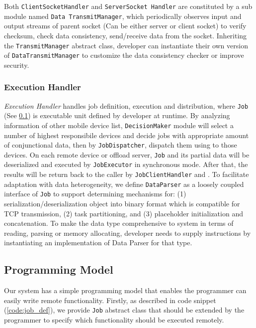 \documentclass[conference]{IEEEtran}
\begin{document}
Both \texttt{ClientSocketHandler} and \texttt{ServerSocket Handler} are constituted by a sub module named \texttt{Data TransmitManager}, which periodically observes input and output streams of parent socket (Can be either server or client socket) to verify checksum, check data consistency, send/receive data from the socket. Inheriting the \texttt{TransmitManager} abstract class, developer can instantiate their own version of \texttt{DataTransmitManager} to customize the data consistency checker or improve security. 

\subsubsection{Execution Handler}
\emph{Execution Handler} handles job definition, execution and distribution, where \texttt{Job} (See \ref{prog_model}) is executable unit defined by developer at runtime. By analyzing information of other mobile device list, \texttt{DecisionMaker} module will select a number of highest responsibile devices and decide jobs with appropriate amount of conjunctional data, then by \texttt{JobDispatcher}, dispatch them using to those devices. On each remote device or offload server, \texttt{Job} and its partial data will be deserialized and executed by \texttt{JobExecutor} in synchronous mode. After that, the results will be return back to the caller by \texttt{JobClientHandler} and . To facilitate adaptation with data heterogeneity, we define \texttt{DataParser} as a loosely coupled interface of \texttt{Job} to support determining mechanisms for: (1) serialization/deserialization object into binary format which is compatible for TCP transmission, (2) task partitioning, and (3) placeholder initialization and concatenation. To make the data type comprehensive to system in terms of reading, parsing or memory allocating, developer needs to supply instructions by instantiating an implementation of Data Parser for that type. 

\subsection{Programming Model} \label{prog_model}
Our system has a simple programming model that enables the programmer can easily write remote functionality. Firstly, as described in code snippet (\ref{code:job_def}), we provide \texttt{Job} abstract class that should be extended by the programmer to specify which functionality should be executed remotely.
\end{document}

